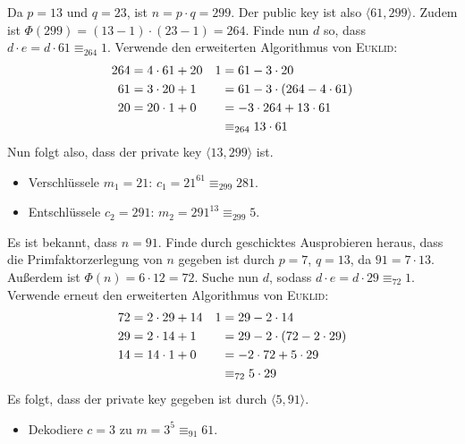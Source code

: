 \documentclass{../exercisesheet}
\begin{document}
\begin{exercise}{5}
\begin{subexercise}
Da $p=13$ und $q=23$, ist $n=p\cdot q = 299$. Der public key ist also $\langle 61,299 \rangle$. Zudem ist $\Phi(299)=(13-1)\cdot(23-1)= 264$. Finde nun $d$ so, dass
$d \cdot e = d \cdot 61 \equiv_{264} 1$. Verwende den erweiterten Algorithmus von \textsc{Euklid}:
\begin{align*}
264 &= 4 \cdot 61 + 20	&	1&=61-3\cdot 20 \\
61 &= 3 \cdot 20 + 1	&	 &= 61-3 \cdot(264-4\cdot 61) \\
20 &= 20 \cdot 1 + 0	&	 &= -3 \cdot 264 + 13 \cdot 61 \\
\null &				&	 &\equiv_{264} 13 \cdot 61
\end{align*}
Nun folgt also, dass der private key $\langle 13, 299 \rangle$ ist.
\begin{itemize}
\item Verschlüssele $m_1=21$: $c_1 = 21^{61} \equiv_{299} 281$.
\item Entschlüssele $c_2=291$: $m_2=291^{13} \equiv_{299} 5$.
\end{itemize}
\end{subexercise}
\begin{subexercise}
Es ist bekannt, dass $n=91$. Finde durch geschicktes Ausprobieren heraus, dass die Primfaktorzerlegung von $n$ gegeben ist durch $p=7$, $q=13$, da $91 = 7 \cdot 13$.
Außerdem ist $\Phi(n)=6 \cdot 12 = 72$. Suche nun $d$, sodass $d \cdot e= d \cdot 29 \equiv_{72} 1$. Verwende erneut den erweiterten Algorithmus von \textsc{Euklid}:
\begin{align*}
72 &= 2 \cdot 29 + 14	&	1 &= 29 - 2 \cdot 14 \\
29 &= 2 \cdot 14 + 1	&	  &= 29 - 2 \cdot (72-2 \cdot 29) \\
14 &= 14 \cdot 1 + 0	&	  &= -2 \cdot 72 + 5 \cdot 29 \\
\null &				&	  &\equiv_{72} 5 \cdot 29
\end{align*}
Es folgt, dass der private key gegeben ist durch $\langle 5,91\rangle$.
\begin{itemize}
\item Dekodiere $c=3$ zu $m=3^5 \equiv_{91} 61$.
\end{itemize}
\end{subexercise}
\end{exercise}
\end{document}
